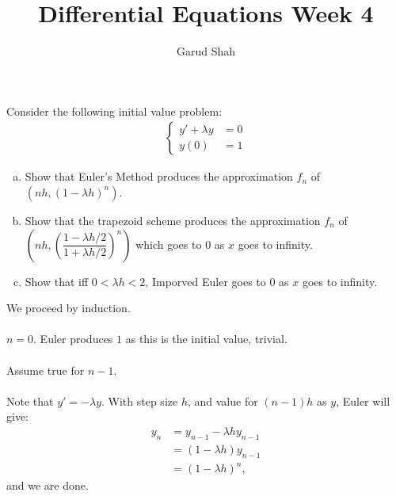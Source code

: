 \documentclass[11pt]{article}
\title{Differential Equations Week 4}
\author{Garud Shah}
\begin{document}
    \maketitle
    \begin{problem}[Problem 1]
        Consider the following initial value problem:
        \begin{align}
            \begin{cases}
                y' + \lambda y &= 0 \\
                y(0) &= 1
            \end{cases}
        \end{align}
        \begin{enumerate}[(a)]
            \item Show that Euler's Method produces the approximation $f_n$ of $(nh, (1-\lambda h)^n)$.
            \item Show that the trapezoid scheme produces the approximation $f_n$ of $\left(nh, \left(\dfrac{1-\lambda h/2}{1+\lambda h/2}\right)^n\right)$ which 
            goes to $0$ as $x$ goes to infinity.
            \item Show that iff $0 < \lambda h < 2$, Imporved Euler goes to $0$ as $x$ goes to infinity.
        \end{enumerate}
    \end{problem}
    \begin{solution}[Solution 1a]
        We proceed by induction. \\~\\
        \BCID $n=0$. Euler produces $1$ as this is the initial value, trivial. \\~\\
        \IHID Assume true for $n-1$. \\~\\
        \ISID Note that $y' = -\lambda y$. With step size $h$, and value for $(n-1)h$ as $y$, Euler will give:
        \begin{align}
            y_n &= y_{n-1} - \lambda hy_{n-1} \\ 
            &=(1-\lambda h)y_{n-1} \\ 
            &=(1-\lambda h)^n,
        \end{align}
        and we are done.
    \end{solution}
\end{document}
